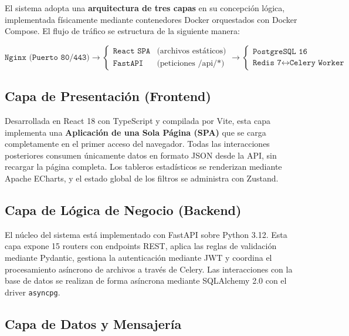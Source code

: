 El sistema adopta una \textbf{arquitectura de tres capas} en su concepción lógica, implementada físicamente mediante contenedores Docker orquestados con Docker Compose. El flujo de tráfico se estructura de la siguiente manera:

\begin{center}
$ \texttt{Nginx (Puerto 80/443)} \longrightarrow \begin{cases} \texttt{React SPA} & \text{(archivos estáticos)} \\ \texttt{FastAPI} & \text{(peticiones /api/*)} \end{cases} \longrightarrow \begin{cases} \texttt{PostgreSQL 16} \\ \texttt{Redis 7} \longleftrightarrow \texttt{Celery Worker} \end{cases} $
\end{center}

\subsection{Capa de Presentación (Frontend)}

Desarrollada en React 18 con TypeScript y compilada por Vite, esta capa implementa una \textbf{Aplicación de una Sola Página (SPA)} que se carga completamente en el primer acceso del navegador. Todas las interacciones posteriores consumen únicamente datos en formato JSON desde la API, sin recargar la página completa. Los tableros estadísticos se renderizan mediante Apache ECharts, y el estado global de los filtros se administra con Zustand.

\subsection{Capa de Lógica de Negocio (Backend)}

El núcleo del sistema está implementado con FastAPI sobre Python 3.12. Esta capa expone 15 routers con endpoints REST, aplica las reglas de validación mediante Pydantic, gestiona la autenticación mediante JWT y coordina el procesamiento asíncrono de archivos a través de Celery. Las interacciones con la base de datos se realizan de forma asíncrona mediante SQLAlchemy 2.0 con el driver \texttt{asyncpg}.

\subsection{Capa de Datos y Mensajería}


